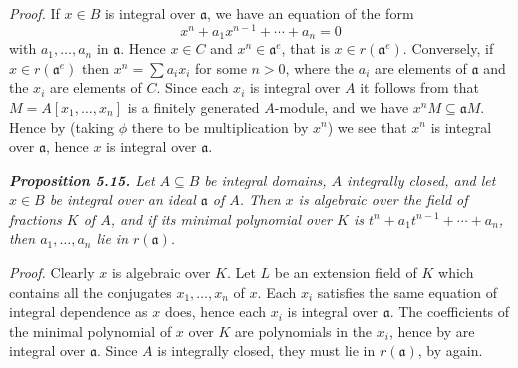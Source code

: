 \noindent\emph{Proof.}  If $x\in B$ is integral over $\mathfrak a$, we have an equation of the form
\[
x^n+a_1x^{n-1}+\cdots+a_n=0
\]
with $a_1,\ldots,a_n$ in $\mathfrak a$.  Hence $x\in C$ and $x^n\in\mathfrak a^e$, that is $x\in r(\mathfrak a^e)$.  Conversely, if
$x\in r(\mathfrak a^e)$ then $x^n=\sum a_ix_i$ for some $n>0$, where the $a_i$ are elements of $\mathfrak a$ and the
$x_i$ are elements of $C$.  Since each $x_i$ is integral over $A$ it follows from  that
$M=A[x_1,\ldots,x_n]$ is a finitely generated $A$-module, and we have $x^nM\subseteq\mathfrak aM$.
Hence by  (taking $\phi$ there to be multiplication by $x^n$) we see that $x^n$ is
integral over $\mathfrak a$, hence $x$ is integral over $\mathfrak a$.\proofbox

\medskip
\noindent\textit{\textbf{Proposition 5.15.} Let $A\subseteq B$ be integral domains, $A$ integrally closed, and
let $x\in B$ be integral over an ideal $\mathfrak a$ of $A$.  Then $x$ is algebraic over the field of
fractions $K$ of $A$, and if its minimal polynomial over $K$ is $t^n+a_1t^{n-1}+\cdots
+a_n$, then $a_1,\ldots,a_n$ lie in $r(\mathfrak a)$.}

\noindent\emph{Proof.}  Clearly $x$ is algebraic over $K$.  Let $L$ be an extension field of $K$ which
contains all the conjugates $x_1,\ldots,x_n$ of $x$.  Each $x_i$ satisfies the same equation
of integral dependence as $x$ does, hence each $x_i$ is integral over $\mathfrak a$.  The coefficients of the minimal polynomial of $x$ over $K$ are polynomials in the $x_i$, hence
by  are integral over $\mathfrak a$.  Since $A$ is integrally closed, they must lie in $r(\mathfrak a)$, by
 again.\proofbox
